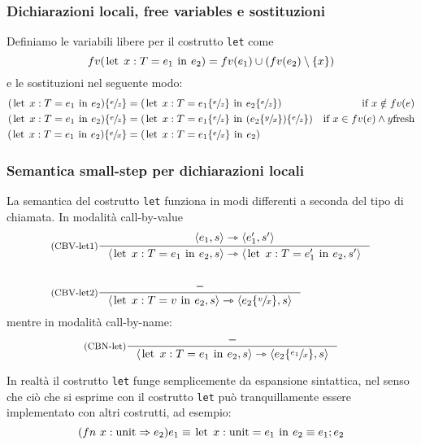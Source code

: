 \documentclass[a4paper, 11pt]{article}
\newcommand{\code}[1]{\textup{\lstinline|#1|}}
\newcommand{\subs}[3]{#1 \lbrace \sfrac{#2}{#3} \rbrace}
\begin{document}
\subsubsection{Dichiarazioni locali, free variables e sostituzioni}
Definiamo le variabili libere per il costrutto \lstinline|let| come \[ fv(\code{let}\ x:T = e_1\ \code{in}\ e_2)  = fv(e_1) \cup (fv(e_2) \setminus \lbrace x \rbrace) \]
e le sostituzioni nel seguente modo: \begin{align*}
	\subs{(\code{let}\ x:T = e_1\ \code{in}\ e_2)}{e}{z} &= (\code{let}\ x:T = \subs{e_1}{e}{z}\ \code{in}\ \subs{e_2}{e}{z}) &\text{if } x \notin fv(e) \\
	 \subs{(\code{let}\ x:T = e_1\ \code{in}\ e_2)}{e}{z} &= (\code{let}\ x:T = \subs{e_1}{e}{z}\ \code{in}\ (\subs{e_2}{y}{x}) \lbrace \sfrac{e}{z} \rbrace) &\text{if } x \in fv(e) \wedge y \text{fresh} \\
	 \subs{(\code{let}\ x:T = e_1\ \code{in}\ e_2)}{e}{x} &= (\code{let}\ x:T = \subs{e_1}{e}{x}\ \code{in}\ e_2) &
\end{align*}

\subsubsection{Semantica small-step per dichiarazioni locali}

La semantica del costrutto \lstinline|let| funziona in modi differenti a seconda del tipo di chiamata. In modalità call-by-value \begin{align*}
	&\inference[(CBV-let1)]{\langle e_1, s \rangle \rightarrowtriangle \langle e_1', s' \rangle}{\langle \code{let}\ x:T = e_1\ \code{in}\ e_2,s \rangle \rightarrowtriangle \langle \code{let}\ x:T = e_1'\ \code{in}\ e_2, s' \rangle} \\ \\
	&\inference[(CBV-let2)]{-}{\langle \code{let}\ x:T = v\ \code{in}\ e_2,s \rangle \rightarrowtriangle \langle \subs{e_2}{v}{x}, s \rangle}
\end{align*}
mentre in modalità call-by-name: \[ \inference[(CBN-let)]{-}{\langle \code{let}\ x:T = e_1\ \code{in}\ e_2, s \rangle \rightarrowtriangle \langle \subs{e_2}{e_1}{x}, s \rangle} \]

In realtà il costrutto \lstinline|let| funge semplicemente da espansione sintattica, nel senso che ciò che si esprime con il costrutto \lstinline|let| può tranquillamente essere implementato con altri costrutti, ad esempio: 	
\[
  (fn\ x:\text{unit} \Rightarrow e_2) e_1 \equiv \code{let}\ x:\text{unit} = e_1\ \code{in}\ e_2 \equiv e_1; e_2
\]
\end{document}
